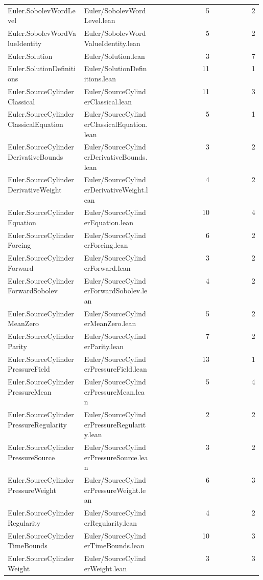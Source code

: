 \begin{longtable}{p{0.30\linewidth}p{0.28\linewidth}rr}
Euler.SobolevWordLevel & Euler/SobolevWordLevel.lean & 5 & 2\\
Euler.SobolevWordValueIdentity & Euler/SobolevWordValueIdentity.lean & 5 & 2\\
Euler.Solution & Euler/Solution.lean & 3 & 7\\
Euler.SolutionDefinitions & Euler/SolutionDefinitions.lean & 11 & 1\\
Euler.SourceCylinderClassical & Euler/SourceCylinderClassical.lean & 11 & 3\\
Euler.SourceCylinderClassicalEquation & Euler/SourceCylinderClassicalEquation.lean & 5 & 1\\
Euler.SourceCylinderDerivativeBounds & Euler/SourceCylinderDerivativeBounds.lean & 3 & 2\\
Euler.SourceCylinderDerivativeWeight & Euler/SourceCylinderDerivativeWeight.lean & 4 & 2\\
Euler.SourceCylinderEquation & Euler/SourceCylinderEquation.lean & 10 & 4\\
Euler.SourceCylinderForcing & Euler/SourceCylinderForcing.lean & 6 & 2\\
Euler.SourceCylinderForward & Euler/SourceCylinderForward.lean & 3 & 2\\
Euler.SourceCylinderForwardSobolev & Euler/SourceCylinderForwardSobolev.lean & 4 & 2\\
Euler.SourceCylinderMeanZero & Euler/SourceCylinderMeanZero.lean & 5 & 2\\
Euler.SourceCylinderParity & Euler/SourceCylinderParity.lean & 7 & 2\\
Euler.SourceCylinderPressureField & Euler/SourceCylinderPressureField.lean & 13 & 1\\
Euler.SourceCylinderPressureMean & Euler/SourceCylinderPressureMean.lean & 5 & 4\\
Euler.SourceCylinderPressureRegularity & Euler/SourceCylinderPressureRegularity.lean & 2 & 2\\
Euler.SourceCylinderPressureSource & Euler/SourceCylinderPressureSource.lean & 3 & 2\\
Euler.SourceCylinderPressureWeight & Euler/SourceCylinderPressureWeight.lean & 6 & 3\\
Euler.SourceCylinderRegularity & Euler/SourceCylinderRegularity.lean & 4 & 2\\
Euler.SourceCylinderTimeBounds & Euler/SourceCylinderTimeBounds.lean & 10 & 3\\
Euler.SourceCylinderWeight & Euler/SourceCylinderWeight.lean & 3 & 3\\

\end{longtable}
